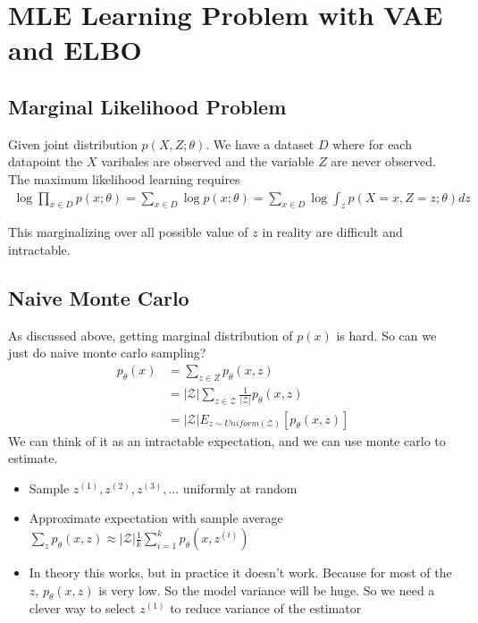 \section{MLE Learning Problem with VAE and ELBO} 
\subsection{Marginal Likelihood Problem} 
Given joint distribution $p(X,Z;\theta)$. We have a dataset $D$ where for each datapoint the $X$ varibales are observed and the variable $Z$ are never observed. The maximum likelihood learning requires
    \begin{align*}
        \log \prod_{x\in D}p(x;\theta) = \sum_{x\in D}\log p(x;\theta) = \sum_{x\in D}\log \int_z p(X=x, Z=z;\theta)dz
    \end{align*}
    
This marginalizing over all possible value of $z$ in reality are difficult and intractable. 

\subsection{Naive Monte Carlo} 
As discussed above, getting marginal distribution of $p(x)$ is hard. So can we just do naive monte carlo sampling? 
    \begin{align*}
        p_\theta(x)
        & = \sum_{z\in Z} p_\theta(x,z) \\
        & = |\mathcal{Z}| \sum_{z\in \mathcal{Z}} \frac{1}{|\mathcal{Z}|}p_\theta(x,z) \\
        & = |\mathcal{Z}| E_{z \sim Uniform(\mathcal{Z})}[p_\theta(x,z)]
    \end{align*}
We can think of it as an intractable expectation, and we can use monte carlo to estimate. 
    \begin{itemize}
        \item Sample $z^{(1)}, z^{(2)}, z^{(3)}, ...$ uniformly at random 
        \item Approximate expectation with sample average $\sum_z p_\theta(x,z) \approx |\mathcal{Z}| \frac{1}{k}\sum_{i=1}^k p_\theta(x, z^{(i)})$
        \item In theory this works, but in practice it doesn't work. Because for most of the $z$, $p_\theta(x,z)$ is very low. So the model variance will be huge. So we need a clever way to select $z^{(1)}$ to reduce variance of the estimator
    \end{itemize}

    
